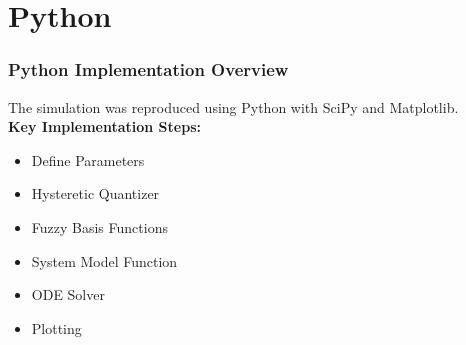 \documentclass[18p]{beamer}
\begin{document}
\section{Python}
\begin{frame}
	\frametitle{Python Implementation Overview}
The simulation was reproduced using Python with SciPy and Matplotlib.\\
\vspace*{1\baselineskip}
\textbf{Key Implementation Steps:}
\begin{itemize}
	\item Define Parameters
	\item Hysteretic Quantizer
	\item Fuzzy Basis Functions
	\item System Model Function
	\item ODE Solver
	\item Plotting
\end{itemize}
\end{frame}

\end{document}
